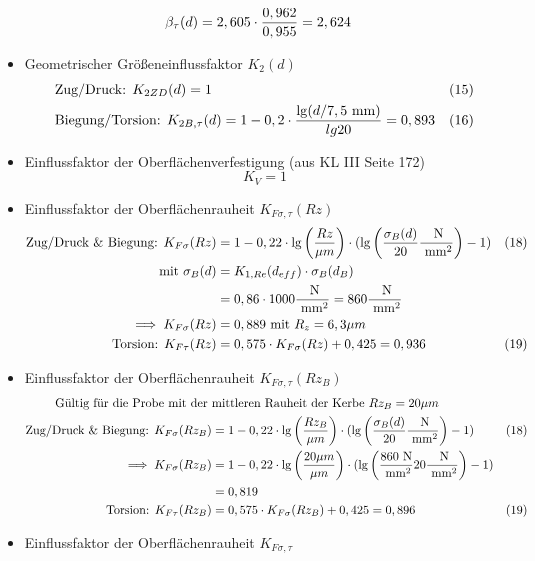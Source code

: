 \begin{itemize}
\begin{align*}
	&\beta_{ \tau} (d)= 2,605 \cdot \frac{0,962}{0,955}  =2,624
	\end{align*}
\item Geometrischer Größeneinflussfaktor $K_2 (d)$ 
	\begin{align*}
	&\text{Zug/Druck: }K_{2ZD} (d) = 1 & (15) \\
	&\text{Biegung/Torsion: } K_{2B,\tau} (d) = 1 -0,2 \cdot  \frac{\lg (d / 7,5 \text{ mm})}{lg 20}  = 0,893 &(16) 
	\end{align*}
\item Einflussfaktor der Oberflächenverfestigung (aus KL III  Seite 172)
	\[
	K_{V} = 1
	\]
\item Einflussfaktor der Oberflächenrauheit $K_{F\sigma, \tau} (Rz)$
	\begin{align*}
	\text{Zug/Druck \& Biegung: } K_{F\sigma} (Rz)&= 1 - 0,22 \cdot \lg \left( \frac{Rz}{\mu m}\right) \cdot ( \lg \left( \frac{\sigma_B (d)}{20}\frac{\text{ N}}{\text{ mm}^2}\right) -1 ) &(18) \\
	\text{mit } \sigma_B (d) &= K_{1,Re} (d_{eff}) \cdot \sigma_B (d_B) \\
	&= 0,86 \cdot 1000\frac{\text{ N}}{\text{ mm}^2} = 860 \frac{\text{ N}}{\text{ mm}^2} \\
	\implies K_{F\sigma} (Rz) &= 0,889 \text{ mit } R_z = 6,3 \mu m\\
	\text{Torsion: } K_{F\tau} (Rz)&= 0,575 \cdot K_{F\sigma} (Rz) +0,425 = 0,936 & (19) 
	\end{align*}
\item Einflussfaktor der Oberflächenrauheit $K_{F\sigma, \tau} (Rz_B)$
	\begin{align*}
	\text{Gültig für die Probe mit der } &\text{mittleren Rauheit der Kerbe } Rz_B= 20 \mu m\\
	\text{Zug/Druck \& Biegung: } K_{F\sigma} (Rz_B)&= 1 - 0,22 \cdot \lg \left( \frac{Rz_B}{\mu m}\right) \cdot ( \lg \left( \frac{\sigma_B (d)}{20}\frac{\text{ N}}{\text{ mm}^2}\right) -1 ) &(18) \\
	\implies K_{F\sigma} (Rz_B) & = 1 - 0,22 \cdot \lg \left( \frac{20 \mu m}{\mu m}\right) \cdot ( \lg \left( \frac{860\text{ N}}{\text{ mm}^2 }{20}\frac{\text{ N}}{\text{ mm}^2}\right) -1 )\\
	&= 0,819 \\
	\text{Torsion: } K_{F\tau} (Rz_B)&= 0,575 \cdot K_{F\sigma} (Rz_B) +0,425 = 0,896 & (19) 
	\end{align*}
\item Einflussfaktor der Oberflächenrauheit $K_{F\sigma, \tau} $
	\begin{align*}

\end{align*}
\end{itemize}
